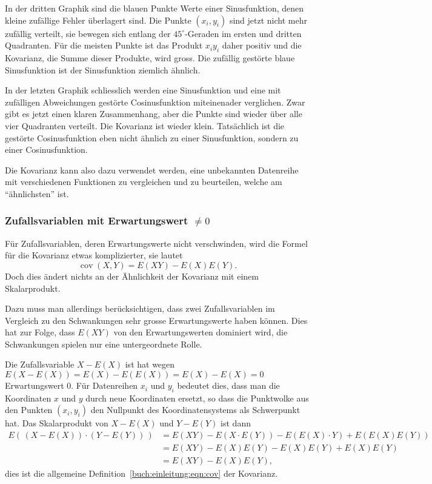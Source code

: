 In der dritten Graphik sind die blauen Punkte Werte einer
Sinusfunktion, denen kleine zufällige Fehler überlagert sind.
Die Punkte $(x_i,y_i)$ sind jetzt nicht mehr zufällig verteilt,
sie bewegen sich entlang der $45^\circ$-Geraden im ersten
und dritten Quadranten.
Für die meisten Punkte ist das Produkt $x_iy_i$ daher positiv und
die Kovarianz, die Summe dieser Produkte, wird gross.
Die zufällig gestörte blaue Sinusfunktion ist der Sinusfunktion
ziemlich ähnlich.

In der letzten Graphik schliesslich werden eine Sinusfunktion und
%
%
eine mit zufälligen Abweichungen gestörte Cosinusfunktion miteinenader
verglichen.
Zwar gibt es jetzt einen klaren Zusammenhang, aber die Punkte sind
wieder über alle vier Quadranten verteilt.
Die Kovarianz ist wieder klein.
Tatsächlich ist die gestörte Cosinusfunktion eben nicht ähnlich zu 
einer Sinusfunktion, sondern zu einer Cosinusfunktion.

Die Kovarianz kann also dazu verwendet werden, eine unbekannten
Datenreihe mit verschiedenen Funktionen zu vergleichen und zu
beurteilen, welche am ``ähnlichsten'' ist.

\subsubsection{Zufallsvariablen mit Erwartungswert $\ne  0$}
Für Zufallsvariablen, deren Erwartungswerte nicht verschwinden,
wird die Formel für die Kovarianz etwas komplizierter, sie lautet
\begin{equation}
\operatorname{cov}(X,Y) = E(XY) - E(X)E(Y).
\label{buch:einleitung:eqn:cov}
\end{equation}
Doch dies ändert nichts an der Ähnlichkeit der Kovarianz 
mit einem Skalarprodukt.

Dazu muss man allerdings berücksichtigen, dass zwei Zufallsvariablen
im Vergleich zu den Schwankungen sehr grosse Erwartungswerte haben können.
Dies hat zur Folge, dass $E(XY)$ von den Erwartungswerten dominiert
wird, die Schwankungen spielen nur eine untergeordnete Rolle.

Die Zufallsvariable $X-E(X)$ ist hat wegen
$E(X-E(X))=E(X)-E(E(X))=E(X)-E(X)=0$ Erwartungswert $0$.
Für Datenreihen $x_i$ und $y_i$ bedeutet dies, dass man
die Koordinaten $x$ und $y$ durch neue Koordinaten ersetzt,
so dass die Punktwolke aus den Punkten $(x_i,y_i)$ den
Nullpunkt des Koordinatensystems als Schwerpunkt hat.
Das Skalarprodukt von $X-E(X)$ und $Y-E(Y)$ ist dann
\begin{align*}
E(\, (X-E(X))\cdot(Y-E(Y))\, )
&=
E(XY)-E(X\cdot E(Y)) - E(E(X)\cdot Y) + E(E(X)E(Y))
\\
&=
E(XY) - E(X)E(Y)-E(X)E(Y)+E(X)E(Y)
\\
&=
E(XY)-E(X)E(Y),
\end{align*}
dies ist die allgemeine Definition~\eqref{buch:einleitung:eqn:cov}
der Kovarianz.

